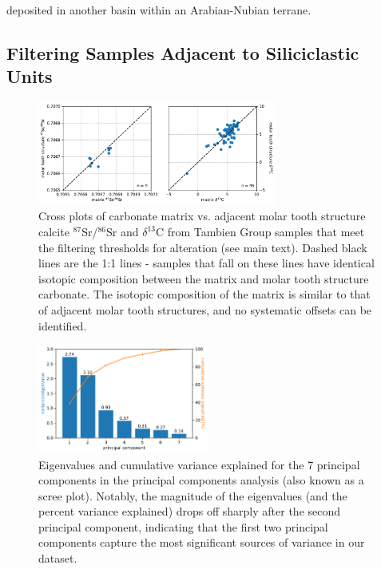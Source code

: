 \documentclass[11pt,letterpaper]{article}
\newcommand{\dC}{$\delta^{13}$C\xspace}
\newcommand{\SrSr}{$^{87}$Sr/$^{86}$Sr\xspace}
\begin{document}
deposited in another basin within an Arabian-Nubian terrane.

\clearpage

\subsection*{Filtering Samples Adjacent to Siliciclastic Units}

\begin{figure}[h!]
\begin{center}
	\includegraphics[width=0.7\textwidth]{Figures/MTS_MTX_Comparison.pdf}
	\caption{Cross plots of carbonate matrix vs. adjacent molar tooth structure calcite \SrSr and \dC from Tambien Group samples that meet the filtering thresholds for alteration (see main text). Dashed black lines are the 1:1 lines - samples that fall on these lines have identical isotopic composition between the matrix and molar tooth structure carbonate. The isotopic composition of the matrix is similar to that of adjacent molar tooth structures, and no systematic offsets can be identified.}
	\label{fig:MTS_MTX_comparison}
\end{center}
\end{figure}

\begin{figure}[h!]
\begin{center}
	\includegraphics[width=0.5\textwidth]{Figures/Siliciclastic_Filtering_Components.pdf}
	\caption{Eigenvalues and cumulative variance explained for the 7 principal components in the principal components analysis (also known as a scree plot). Notably, the magnitude of the eigenvalues (and the percent variance explained) drops off sharply after the second principal component, indicating that the first two principal components capture the most significant sources of variance in our dataset.}
	\label{fig:Siliciclastic_Filtering_Components}
\end{center}
\end{figure}
\end{document}
